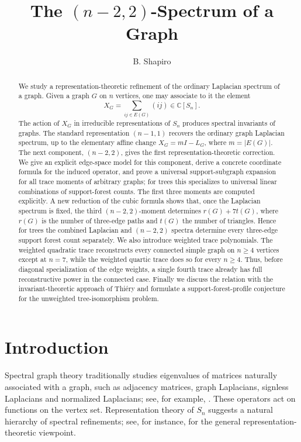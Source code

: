 \documentclass{amsart}
\title{The $(n-2,2)$-Spectrum of a Graph}
\author{B. Shapiro}
\date{}
\theoremstyle{definition}
\newcommand{\C}{\mathbb C}
\begin{document}
\begin{abstract}
We study a representation-theoretic refinement of the ordinary
Laplacian spectrum of a graph.  Given a graph $G$ on $n$ vertices,
one may associate to it the element
\[
X_G=\sum_{ij\in E(G)} (ij)\in \C[S_n].
\]
The action of $X_G$ in irreducible representations of $S_n$ produces
spectral invariants of graphs.  The standard representation $(n-1,1)$
recovers the ordinary graph Laplacian spectrum, up to the elementary
affine change $X_G=mI-L_G$, where $m=|E(G)|$.  The next component,
$(n-2,2)$, gives the first representation-theoretic correction.  We give
an explicit edge-space model for this component, derive a concrete
coordinate formula for the induced operator, and prove a universal
support-subgraph expansion for all trace moments of arbitrary graphs; for
trees this specializes to universal linear combinations of support-forest
counts.  The first three moments are computed explicitly.  A new reduction
of the cubic formula shows that, once the Laplacian spectrum is fixed, the
third $(n-2,2)$-moment determines $r(G)+7t(G)$, where $r(G)$ is the number of
three-edge paths and $t(G)$ the number of triangles.  Hence for trees the
combined Laplacian and $(n-2,2)$ spectra determine every three-edge support
forest count separately.  We also introduce weighted trace polynomials.  The
weighted quadratic trace reconstructs every connected simple graph on
$n\geq4$ vertices except at $n=7$, while the weighted quartic trace does so
for every $n\geq4$.  Thus, before diagonal specialization of the edge
weights, a single fourth trace already has full reconstructive power in the
connected case.  Finally we discuss the relation with the
invariant-theoretic approach of Thi\'ery \cite{Thiery} and formulate a
support-forest-profile conjecture for the unweighted tree-isomorphism
problem.
\end{abstract}

\maketitle

\section{Introduction}

Spectral graph theory traditionally studies eigenvalues of matrices
naturally associated with a graph, such as adjacency matrices, graph
Laplacians, signless Laplacians and normalized Laplacians; see, for example,
\cite{GodsilRoyle,VanDamHaemers}.  These
operators act on functions on the vertex set.  Representation theory of
$S_n$ suggests a natural hierarchy of spectral refinements; see, for instance,
\cite{Diaconis} for the general representation-theoretic viewpoint.
\end{document}

